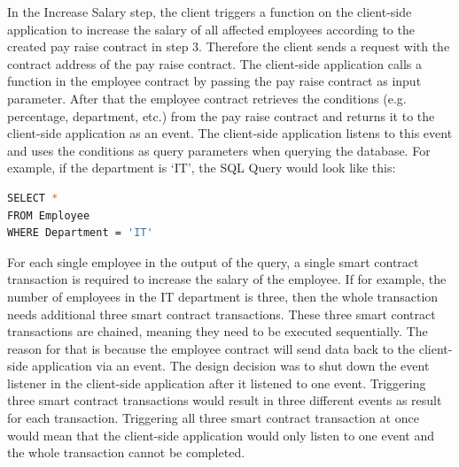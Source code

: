 In the Increase Salary step, the client triggers a function on the client-side application to increase the salary of all affected employees according to the created pay raise contract in step 3. Therefore the client sends a request with the contract address of the pay raise contract. The client-side application calls a function in the employee contract by passing the pay raise contract as input parameter. After that the employee contract retrieves the conditions (e.g. percentage, department, etc.) from the pay raise contract and returns it to the client-side application as an event. The client-side application listens to this event and uses the conditions as query parameters when querying the database. For example, if the department is ‘IT’, the SQL Query would look like this:

\begin{lstlisting}[language=bash]
SELECT *
FROM Employee
WHERE Department = 'IT'
\end{lstlisting}

For each single employee in the output of the query, a single smart contract transaction is required to increase the salary of the employee. If for example, the number of employees in the IT department is three, then the whole transaction needs additional three smart contract transactions. These three smart contract transactions are chained, meaning they need to be executed sequentially. The reason for that is because the employee contract will send data back to the client-side application via an event. The design decision was to shut down the event listener in the client-side application after it listened to one event. Triggering three smart contract transactions would result in three different events as result for each transaction. Triggering all three smart contract transaction at once would mean that the client-side application would only listen to one event and the whole transaction cannot be completed.

